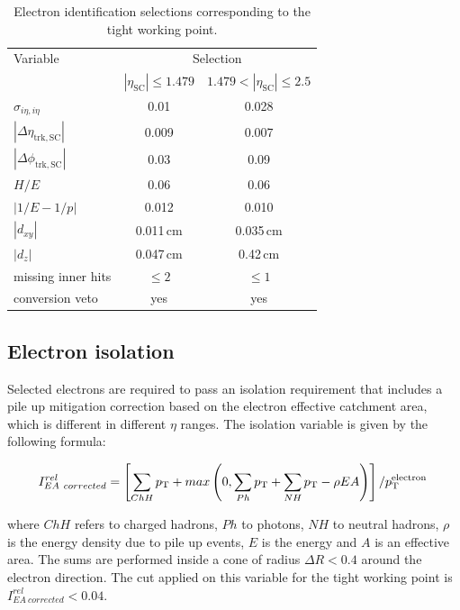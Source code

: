 \begin{table}[htb]
\caption{Electron identification selections corresponding to the tight working point.}\label{tab:tightele}
\begin{tabular}{lcc}
\toprule
Variable & \multicolumn{2}{c}{Selection}\\
 & $|\eta_\mathrm{SC}|\leq 1.479$ & $1.479 < |\eta_\mathrm{SC}| \leq 2.5$ \\
\midrule
$\sigma_{i\eta,i\eta}$ & 0.01 & 0.028 \\
$|\Delta\eta_\mathrm{trk,SC}|$ & 0.009 & 0.007 \\
$|\Delta\phi_\mathrm{trk,SC}|$ & 0.03 & 0.09 \\
$H/E$ & 0.06 & 0.06 \\
$|1/E - 1/p|$ & 0.012 & 0.010 \\
$|d_{xy}|$ & 0.011\,cm & 0.035\,cm\\
$|d_{z}|$ & 0.047\,cm & 0.42\,cm\\
missing inner hits & $\leq 2$ & $\leq 1$\\
conversion veto & yes & yes \\
\bottomrule
\end{tabular}
\end{table}

\subsection{Electron isolation}
Selected electrons are required to pass an isolation requirement that includes a pile up mitigation correction based on the electron effective catchment area, which is different in different $\eta$ ranges. The isolation variable is given by the following formula:

\begin{equation}
I^{rel}_{EA~corrected} = \left[ \sum_{ChH}p_\mathrm{T} + max\left( 0, \sum_{Ph}p_\mathrm{T} + \sum_{NH}p_\mathrm{T} - \rho EA \right) \right]/p_\mathrm{T}^\mathrm{electron} \,
\end{equation}

where $ChH$ refers to charged hadrons, $Ph$ to photons, $NH$ to neutral hadrons, $\rho$ is the energy density due to pile up events, $E$ is the energy and $A$ is an effective area. The sums are performed inside a cone of radius $\Delta R < 0.4$ around the electron direction. The cut applied on this variable for the tight working point is $I^{rel}_{EA~corrected} < 0.04$.

